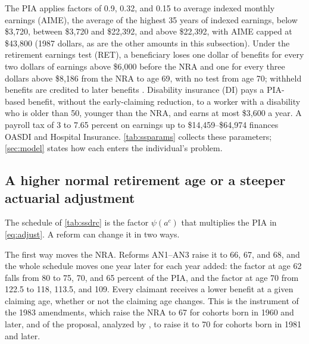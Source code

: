 The PIA applies factors of 0.9, 0.32, and 0.15 to average indexed monthly earnings (AIME), the average of the highest 35 years of indexed earnings, below \$3,720, between \$3,720 and \$22,392, and above \$22,392, with AIME capped at \$43,800 (1987 dollars, as are the other amounts in this subsection). %
Under the retirement earnings test (RET), a beneficiary loses one dollar of benefits for every two dollars of earnings above \$6,000 before the NRA and one for every three dollars above \$8,186 from the NRA to age 69, with no test from age 70; withheld benefits are credited to later benefits \citep{french2011effects}. %
Disability insurance (DI) pays a PIA-based benefit, without the early-claiming reduction, to a worker with a disability who is older than 50, younger than the NRA, and earns at most \$3,600 a year. %
A payroll tax of 3 to 7.65 percent on earnings up to \$14,459--\$64,974 finances OASDI and Hospital Insurance. %
\autoref{tab:ssparams} collects these parameters; \autoref{sec:model} states how each enters the individual's problem.

\subsection{A higher normal retirement age or a steeper actuarial adjustment}\label{subsec:twoways}

The schedule of \autoref{tab:ssdrc} is the factor $\psi(a^c)$ that multiplies the PIA in \eqref{eq:adjust}. A reform can change it in two ways.

The first way moves the NRA. Reforms AN1--AN3 raise it to 66, 67, and 68, and the whole schedule moves one year later for each year added: the factor at age 62 falls from 80 to 75, 70, and 65 percent of the PIA, and the factor at age 70 from 122.5 to 118, 113.5, and 109. %
Every claimant receives a lower benefit at a given claiming age, whether or not the claiming age changes. %
This is the instrument of the 1983 amendments, which raise the NRA to 67 for cohorts born in 1960 and later, and of the proposal, analyzed by \citet{cbo2024socialsecurity}, to raise it to 70 for cohorts born in 1981 and later. %

